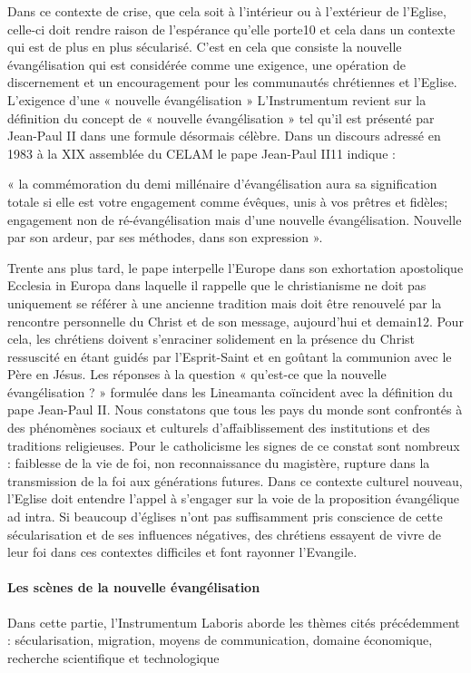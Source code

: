 Dans ce contexte de crise, que cela soit à l’intérieur ou à l’extérieur de l’Eglise, celle-ci doit rendre
raison de l’espérance qu’elle porte10 et cela dans un contexte qui est de plus en plus sécularisé. C’est
en cela que consiste la nouvelle évangélisation qui est considérée comme une exigence, une opération
de discernement et un encouragement pour les communautés chrétiennes et l’Eglise.
L'exigence d’une « nouvelle évangélisation »
L’Instrumentum revient sur la définition du concept de « nouvelle évangélisation » tel qu’il est
présenté par Jean-Paul II dans une formule désormais célèbre. Dans un discours adressé en 1983 à la
XIX assemblée du CELAM le pape Jean-Paul II11 indique : 
\begin{singlequote}
    « la commémoration du demi millénaire
d'évangélisation aura sa signification totale si elle est votre engagement comme évêques, unis à vos
prêtres et fidèles; engagement non de ré-évangélisation mais d'une nouvelle évangélisation. Nouvelle
par son ardeur, par ses méthodes, dans son expression ». 
\end{singlequote}Trente ans plus tard, le pape interpelle
l’Europe dans son exhortation apostolique Ecclesia in Europa dans laquelle il rappelle que le
christianisme ne doit pas uniquement se référer à une ancienne tradition mais doit être renouvelé par
la rencontre personnelle du Christ et de son message, aujourd’hui et demain12. Pour cela, les chrétiens
doivent s’enraciner solidement en la présence du Christ ressuscité en étant guidés par l’Esprit-Saint
et en goûtant la communion avec le Père en Jésus.
Les réponses à la question « qu’est-ce que la nouvelle évangélisation ? » formulée dans les
Lineamanta coïncident avec la définition du pape Jean-Paul II. Nous constatons que tous les pays du
monde sont confrontés à des phénomènes sociaux et culturels d’affaiblissement des institutions et des
traditions religieuses. Pour le catholicisme les signes de ce constat sont nombreux : faiblesse de la vie
de foi, non reconnaissance du magistère, rupture dans la transmission de la foi aux générations
futures.
Dans ce contexte culturel nouveau, l’Eglise doit entendre l’appel à s’engager sur la voie de la
proposition évangélique ad intra. Si beaucoup d’églises n’ont pas suffisamment pris conscience de
cette sécularisation et de ses influences négatives, des chrétiens essayent de vivre de leur foi dans ces
contextes difficiles et font rayonner l’Evangile.
\paragraph{Les scènes de la nouvelle évangélisation}
Dans cette partie, l’Instrumentum Laboris aborde les thèmes cités précédemment : sécularisation,
migration, moyens de communication, domaine économique, recherche scientifique et technologique
 
